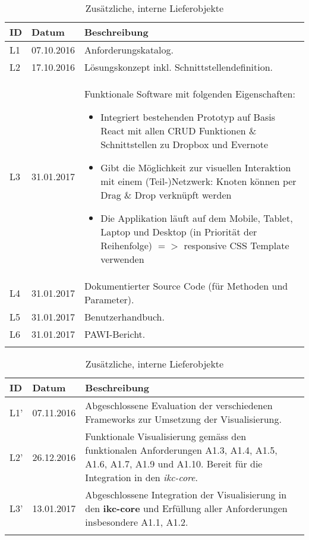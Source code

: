 \begin{longtable}{|p{1cm} | p{2cm} | p{8.1cm}|}
  \hline
    ID & Datum &  Beschreibung \\\hline
    L1 & 07.10.2016 & Anforderungskatalog.\\\hline
    L2 & 17.10.2016 & Lösungskonzept inkl. Schnittstellendefinition.\\\hline
    L3 & 31.01.2017 & Funktionale Software mit folgenden Eigenschaften:
    \begin{itemize}
        \item Integriert bestehenden Prototyp auf Basis React mit allen CRUD     Funktionen \& Schnittstellen zu Dropbox und Evernote
        \item Gibt die Möglichkeit zur visuellen Interaktion mit einem 
            (Teil-)Netzwerk: Knoten können per Drag \& Drop verknüpft werden
        \item Die Applikation läuft auf dem Mobile, Tablet, Laptop und Desktop (in     Priorität der Reihenfolge) $=>$ responsive CSS Template verwenden
    \end{itemize}
    \\\hline
    L4 & 31.01.2017 & Dokumentierter Source Code (für Methoden und Parameter).\\\hline
    L5 & 31.01.2017 & Benutzerhandbuch.\\\hline
    L6 & 31.01.2017 & PAWI-Bericht.\\\hline
    \caption{Zusätzliche, interne Lieferobjekte}
  \label{tab:set-lieferobjekte}
\end{longtable}
 
\begin{longtable}{|p{1cm} | p{2cm} | p{8.1cm}|}
  \hline
    ID & Datum &  Beschreibung \\\hline
    L1' & 07.11.2016 & Abgeschlossene Evaluation der verschiedenen Frameworks zur Umsetzung der Visualisierung.\\\hline
    L2' & 26.12.2016 & Funktionale Visualisierung gemäss den funktionalen Anforderungen A1.3, A1.4, A1.5, A1.6, A1.7, A1.9 und A1.10. Bereit für die Integration in den \textit{ikc-core}.\\\hline
    L3' & 13.01.2017 & Abgeschlossene Integration der Visualisierung in den \textbf{ikc-core} und Erfüllung aller Anforderungen insbesondere A1.1, A1.2.\\\hline
    \caption{Zusätzliche, interne Lieferobjekte}
  \label{tab:add-lieferobjekte}
\end{longtable}




